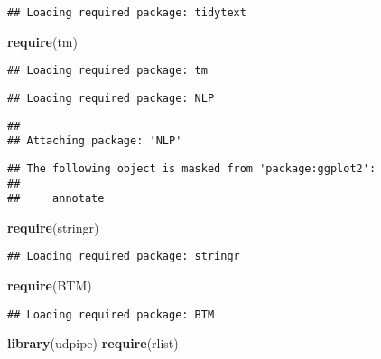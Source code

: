 \documentclass[
]{article}
\newenvironment{Shaded}{\begin{snugshade}}{\end{snugshade}}
\newcommand{\KeywordTok}[1]{\textcolor[rgb]{0.13,0.29,0.53}{\textbf{#1}}}
\newcommand{\NormalTok}[1]{#1}
\begin{document}
\begin{verbatim}
## Loading required package: tidytext
\end{verbatim}

\begin{Shaded}
\begin{Highlighting}[]
\KeywordTok{require}\NormalTok{(tm)}
\end{Highlighting}
\end{Shaded}

\begin{verbatim}
## Loading required package: tm
\end{verbatim}

\begin{verbatim}
## Loading required package: NLP
\end{verbatim}

\begin{verbatim}
## 
## Attaching package: 'NLP'
\end{verbatim}

\begin{verbatim}
## The following object is masked from 'package:ggplot2':
## 
##     annotate
\end{verbatim}

\begin{Shaded}
\begin{Highlighting}[]
\KeywordTok{require}\NormalTok{(stringr)}
\end{Highlighting}
\end{Shaded}

\begin{verbatim}
## Loading required package: stringr
\end{verbatim}

\begin{Shaded}
\begin{Highlighting}[]
\KeywordTok{require}\NormalTok{(BTM)}
\end{Highlighting}
\end{Shaded}

\begin{verbatim}
## Loading required package: BTM
\end{verbatim}

\begin{Shaded}
\begin{Highlighting}[]
\KeywordTok{library}\NormalTok{(udpipe)}
\KeywordTok{require}\NormalTok{(rlist)}
\end{Highlighting}
\end{Shaded}
\end{document}

